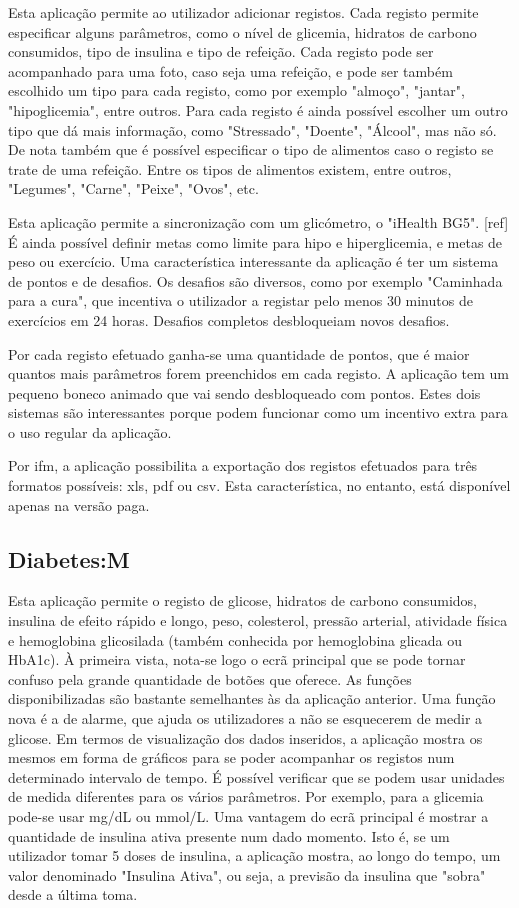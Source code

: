 Esta aplicação permite ao utilizador adicionar registos. Cada registo permite especificar alguns parâmetros, como o nível de glicemia, hidratos de carbono consumidos, tipo de insulina e tipo de refeição. Cada registo pode ser acompanhado para uma foto, caso seja uma refeição, e pode ser também escolhido um tipo para cada registo, como por exemplo "almoço", "jantar", "hipoglicemia", entre outros. Para cada registo é ainda possível escolher um outro tipo que dá mais informação, como "Stressado", "Doente", "Álcool", mas não só. De nota também que é possível especificar o tipo de alimentos caso o registo se trate de uma refeição. Entre os tipos de alimentos existem, entre outros, "Legumes", "Carne", "Peixe", "Ovos", etc.

Esta aplicação permite a sincronização com um glicómetro, o "iHealth BG5". [ref] É ainda possível definir metas como limite para hipo e hiperglicemia, e metas de peso ou exercício. Uma característica interessante da aplicação é ter um sistema de pontos e de desafios. Os desafios são diversos, como por exemplo "Caminhada para a cura", que incentiva o utilizador a registar pelo menos 30 minutos de exercícios em 24 horas. Desafios completos desbloqueiam novos desafios. 

Por cada registo efetuado ganha-se uma quantidade de pontos, que é maior quantos mais parâmetros forem preenchidos em cada registo. A aplicação tem um pequeno boneco animado que vai sendo desbloqueado com pontos. Estes dois sistemas são interessantes porque podem funcionar como um incentivo extra para o uso regular da aplicação. 

Por ifm, a aplicação possibilita a exportação dos registos efetuados para três formatos possíveis: xls, pdf ou csv. Esta característica, no entanto, está disponível apenas na versão paga.

\subsection{Diabetes:M}

Esta aplicação permite o registo de glicose, hidratos de carbono consumidos, insulina de efeito rápido e longo, peso, colesterol, pressão arterial, atividade física e hemoglobina glicosilada (também conhecida por hemoglobina glicada ou HbA1c). À primeira vista, nota-se logo o ecrã principal que se pode tornar confuso pela grande quantidade de botões que oferece. As funções disponibilizadas são bastante semelhantes às da aplicação anterior. Uma função nova é a de alarme, que ajuda os utilizadores a não se esquecerem de medir a glicose. Em termos de visualização dos dados inseridos, a aplicação mostra os mesmos em forma de gráficos para se poder acompanhar os registos num determinado intervalo de tempo. É possível verificar que se podem usar unidades de medida diferentes para os vários parâmetros. Por exemplo, para a glicemia pode-se usar mg/dL ou mmol/L. Uma vantagem do ecrã principal é mostrar a quantidade de insulina ativa presente num dado momento. Isto é, se um utilizador tomar 5 doses de insulina, a aplicação mostra, ao longo do tempo, um valor denominado "Insulina Ativa", ou seja, a previsão da insulina que "sobra" desde a última toma.

